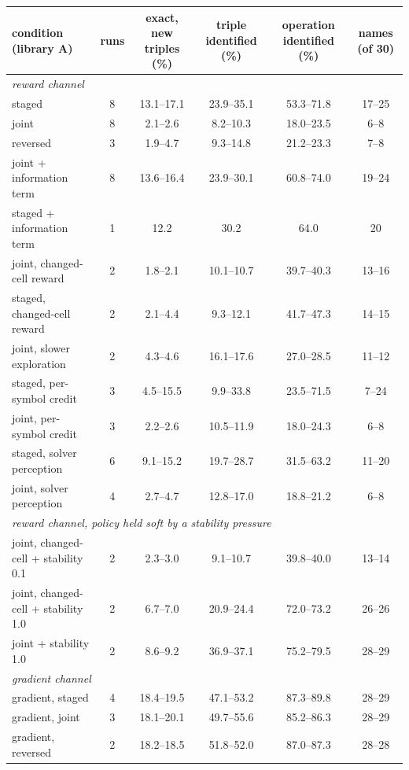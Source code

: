 \begin{tabular}{lccccc}\toprule
condition (library A) & runs & exact, new triples (\%) & triple identified (\%) & operation identified (\%) & names (of 30) \\ \midrule
\multicolumn{6}{l}{\emph{reward channel}} \\
\quad staged & 8 & 13.1--17.1 & 23.9--35.1 & 53.3--71.8 & 17--25 \\
\quad joint & 8 & 2.1--2.6 & 8.2--10.3 & 18.0--23.5 & 6--8 \\
\quad reversed & 3 & 1.9--4.7 & 9.3--14.8 & 21.2--23.3 & 7--8 \\
\quad joint + information term & 8 & 13.6--16.4 & 23.9--30.1 & 60.8--74.0 & 19--24 \\
\quad staged + information term & 1 & 12.2 & 30.2 & 64.0 & 20 \\
\quad joint, changed-cell reward & 2 & 1.8--2.1 & 10.1--10.7 & 39.7--40.3 & 13--16 \\
\quad staged, changed-cell reward & 2 & 2.1--4.4 & 9.3--12.1 & 41.7--47.3 & 14--15 \\
\quad joint, slower exploration & 2 & 4.3--4.6 & 16.1--17.6 & 27.0--28.5 & 11--12 \\
\quad staged, per-symbol credit & 3 & 4.5--15.5 & 9.9--33.8 & 23.5--71.5 & 7--24 \\
\quad joint, per-symbol credit & 3 & 2.2--2.6 & 10.5--11.9 & 18.0--24.3 & 6--8 \\
\quad staged, solver perception & 6 & 9.1--15.2 & 19.7--28.7 & 31.5--63.2 & 11--20 \\
\quad joint, solver perception & 4 & 2.7--4.7 & 12.8--17.0 & 18.8--21.2 & 6--8 \\
\multicolumn{6}{l}{\emph{reward channel, policy held soft by a stability pressure}} \\
\quad joint, changed-cell + stability 0.1 & 2 & 2.3--3.0 & 9.1--10.7 & 39.8--40.0 & 13--14 \\
\quad joint, changed-cell + stability 1.0 & 2 & 6.7--7.0 & 20.9--24.4 & 72.0--73.2 & 26--26 \\
\quad joint + stability 1.0 & 2 & 8.6--9.2 & 36.9--37.1 & 75.2--79.5 & 28--29 \\
\multicolumn{6}{l}{\emph{gradient channel}} \\
\quad gradient, staged & 4 & 18.4--19.5 & 47.1--53.2 & 87.3--89.8 & 28--29 \\
\quad gradient, joint & 3 & 18.1--20.1 & 49.7--55.6 & 85.2--86.3 & 28--29 \\
\quad gradient, reversed & 2 & 18.2--18.5 & 51.8--52.0 & 87.0--87.3 & 28--28 \\
\bottomrule
\end{tabular}
